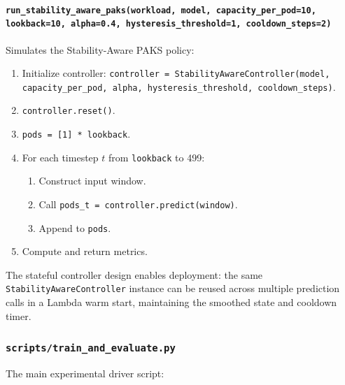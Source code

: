 \paragraph{\texttt{run\_stability\_aware\_paks(workload, model, capacity\_per\_pod=10, lookback=10, alpha=0.4, hysteresis\_threshold=1, cooldown\_steps=2)}}
Simulates the Stability-Aware PAKS policy:
\begin{enumerate}
  \item Initialize controller: \texttt{controller = StabilityAwareController(model, capacity\_per\_pod, alpha, hysteresis\_threshold, cooldown\_steps)}.
  \item \texttt{controller.reset()}.
  \item \texttt{pods = [1] * lookback}.
  \item For each timestep $t$ from \texttt{lookback} to 499:
  \begin{enumerate}
    \item Construct input window.
    \item Call \texttt{pods\_t = controller.predict(window)}.
    \item Append to \texttt{pods}.
  \end{enumerate}
  \item Compute and return metrics.
\end{enumerate}

The stateful controller design enables deployment: the same \texttt{StabilityAwareController} instance can be reused across multiple prediction calls in a Lambda warm start, maintaining the smoothed state and cooldown timer.

\subsubsection{\texttt{scripts/train\_and\_evaluate.py}}

The main experimental driver script:

